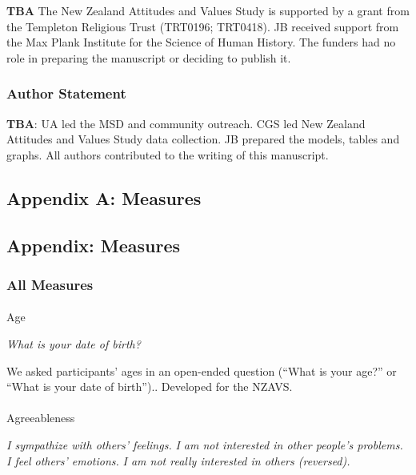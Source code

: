 \documentclass[
  single column]{article}
\makeatletter
\let\oldparagraph\paragraph
\renewcommand{\paragraph}{
    \@ifstar
      \xxxParagraphStar
      \xxxParagraphNoStar
  }
\newcommand{\xxxParagraphStar}[1]{\oldparagraph*{#1}\mbox{}}
\newcommand{\xxxParagraphNoStar}[1]{\oldparagraph{#1}\mbox{}}
\makeatother
\begin{document}
\textbf{TBA} The New Zealand Attitudes and Values Study is supported by
a grant from the Templeton Religious Trust (TRT0196; TRT0418). JB
received support from the Max Plank Institute for the Science of Human
History. The funders had no role in preparing the manuscript or deciding
to publish it.

\subsubsection{Author Statement}\label{author-statement}

\textbf{TBA}: UA led the MSD and community outreach. CGS led New Zealand
Attitudes and Values Study data collection. JB prepared the models,
tables and graphs. All authors contributed to the writing of this
manuscript.

\newpage{}

\subsection{Appendix A: Measures}\label{appendix-a}

\subsection{Appendix: Measures}\label{appendix-measures}

\subsubsection{All Measures}\label{all-measures}

\paragraph{Age}\label{age}

\emph{What is your date of birth?}

We asked participants' ages in an open-ended question (``What is your
age?'' or ``What is your date of birth'').. Developed for the NZAVS.

\paragraph{Agreeableness}\label{agreeableness}

\emph{I sympathize with others' feelings.} \emph{I am not interested in
other people's problems.} \emph{I feel others' emotions.} \emph{I am not
really interested in others (reversed).}
\end{document}

